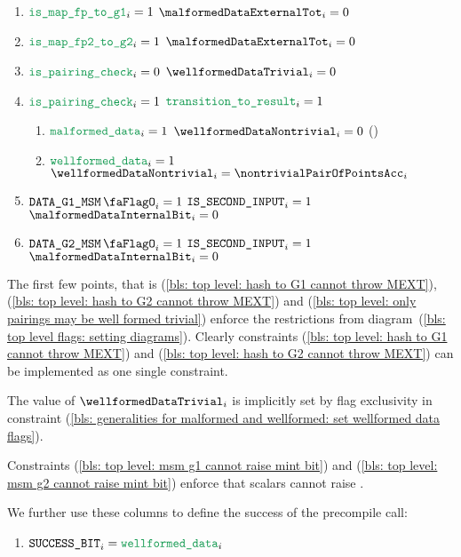 \begin{enumerate}[resume]
    \item
        \label{bls: top level: hash to G1 cannot throw MEXT}
        \If $\locIsBlsMapFpToGOne    _{i} = 1$ \Then $\malformedDataExternalTot _{i} = 0$
    \item
        \label{bls: top level: hash to G2 cannot throw MEXT}
        \If $\locIsBlsMapFpTwoToGTwo _{i} = 1$ \Then $\malformedDataExternalTot _{i} = 0$
    \item
        \label{bls: top level: only pairings may be well formed trivial}
        \If $\locIsBlsPairingCheck _{i} = 0$ \Then $\wellformedDataTrivial _{i} = 0$
    \item
        \If $\locIsBlsPairingCheck _{i} = 1$ \et   $\locTransitionToResult _{i} = 1$
        \begin{enumerate}
            \item
                \If $\locMalformedData _{i} = 1$ \Then $\wellformedDataNontrivial _{i} = 0$ \quad (\sanityCheck)
            \item
                \label{bls: generalities for malformed and wellformed: set wellformed data flags}
                \If $\locWellformedData _{i} = 1$ \Then $\wellformedDataNontrivial _{i} = \nontrivialPairOfPointsAcc _{i}$
        \end{enumerate}
    \item 
        \label{bls: top level: msm g1 cannot raise mint bit}  
        \If $\isBlsGOneMsmData _{i} = 1$ \et $\texttt{IS\_SECOND\_INPUT} _{i} = 1$ \Then $\malformedDataInternalBit _{i} = 0$
    \item 
        \label{bls: top level: msm g2 cannot raise mint bit}
        \If $\isBlsGTwoMsmData _{i} = 1$ \et $\texttt{IS\_SECOND\_INPUT} _{i} = 1$ \Then $\malformedDataInternalBit _{i} = 0$
\end{enumerate}
\saNote{}
The first few points, that is
(\ref{bls: top level: hash to G1 cannot throw MEXT}),
(\ref{bls: top level: hash to G2 cannot throw MEXT}) and
(\ref{bls: top level: only pairings may be well formed trivial})
enforce the restrictions from
diagram~(\ref{bls: top level flags: setting diagrams}).
Clearly constraints
(\ref{bls: top level: hash to G1 cannot throw MEXT}) and
(\ref{bls: top level: hash to G2 cannot throw MEXT})
can be implemented as one single constraint.

\saNote{}
The value of $\wellformedDataTrivial_{i}$ is implicitly set by flag exclusivity in constraint (\ref{bls: generalities for malformed and wellformed: set wellformed data flags}).

\saNote{}
Constraints
(\ref{bls: top level: msm g1 cannot raise mint bit}) and
(\ref{bls: top level: msm g2 cannot raise mint bit})
enforce that scalars cannot raise \malformedDataInternalBit{}.

\noindent We further use these columns to define the success of the precompile call:
\begin{enumerate}[resume]
    \item $\blsSuccessBit  _{i} = \locWellformedData _{i}$
\end{enumerate}
